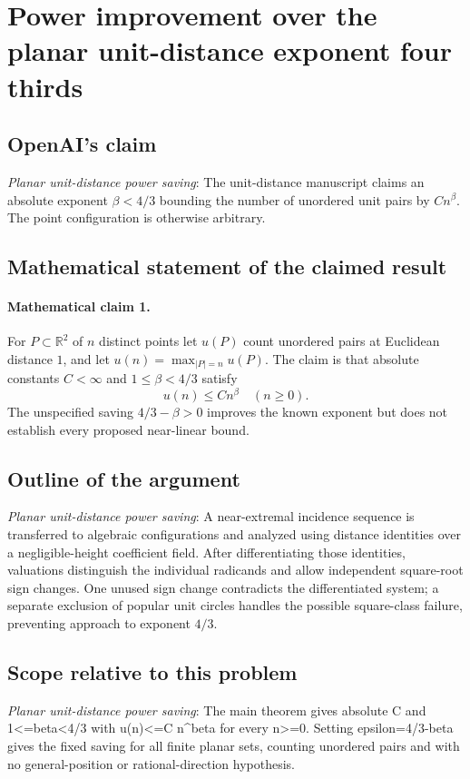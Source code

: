 \documentclass[11pt]{article}
\begin{document}
\section*{Power improvement over the planar unit-distance exponent four thirds}

\subsection{OpenAI's claim}
\textit{Planar unit-distance power saving}: The unit-distance manuscript claims an absolute exponent $\beta<4/3$ bounding the number of unordered unit pairs by $C n^\beta$. The point configuration is otherwise arbitrary.

\subsection{Mathematical statement of the claimed result}
\paragraph{Mathematical claim 1.} For $P\subset\mathbb R^2$ of $n$ distinct points let $u(P)$ count unordered pairs at Euclidean distance $1$, and let $u(n)=\max_{|P|=n}u(P)$. The claim is that absolute constants $C<\infty$ and $1\le\beta<4/3$ satisfy \[u(n)\le Cn^\beta\quad(n\ge0).\] The unspecified saving $4/3-\beta>0$ improves the known exponent but does not establish every proposed near-linear bound.

\subsection{Outline of the argument}
\textit{Planar unit-distance power saving}: A near-extremal incidence sequence is transferred to algebraic configurations and analyzed using distance identities over a negligible-height coefficient field. After differentiating those identities, valuations distinguish the individual radicands and allow independent square-root sign changes. One unused sign change contradicts the differentiated system; a separate exclusion of popular unit circles handles the possible square-class failure, preventing approach to exponent $4/3$.

\subsection{Scope relative to this problem}
\textit{Planar unit-distance power saving}: The main theorem gives absolute C and 1<=beta<4/3 with u(n)<=C n\textasciicircum{}beta for every n>=0. Setting epsilon=4/3-beta gives the fixed saving for all finite planar sets, counting unordered pairs and with no general-position or rational-direction hypothesis.
\end{document}
